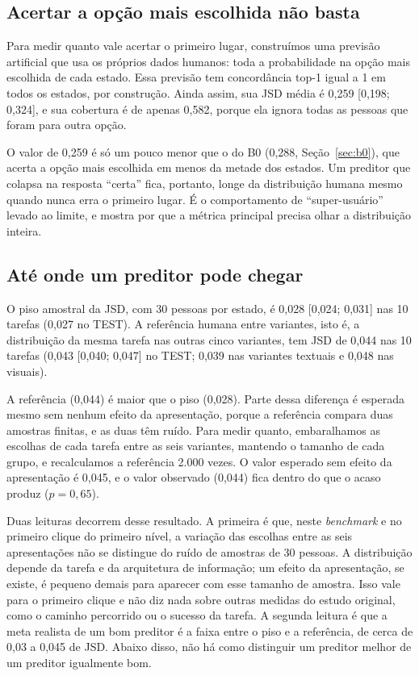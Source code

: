 \documentclass[12pt,oneside,a4paper,chapter=TITLE,english,brazil]{abntex2}
\begin{document}
\subsection{Acertar a opção mais escolhida não basta}

\begin{real}
Para medir quanto vale acertar o primeiro lugar, construímos uma previsão artificial que usa os próprios dados humanos: toda a probabilidade na opção mais escolhida de cada estado. Essa previsão tem concordância top-1 igual a 1 em todos os estados, por construção. Ainda assim, sua JSD média é 0,259 [0,198; 0,324], e sua cobertura é de apenas 0,582, porque ela ignora todas as pessoas que foram para outra opção.
\end{real}

O valor de 0,259 é só um pouco menor que o do B0 (0,288, Seção~\ref{sec:b0}), que acerta a opção mais escolhida em menos da metade dos estados. Um preditor que colapsa na resposta ``certa'' fica, portanto, longe da distribuição humana mesmo quando nunca erra o primeiro lugar. É o comportamento de ``super-usuário'' levado ao limite, e mostra por que a métrica principal precisa olhar a distribuição inteira.

\subsection{Até onde um preditor pode chegar}

\begin{real}
O piso amostral da JSD, com 30 pessoas por estado, é 0,028 [0,024; 0,031] nas 10 tarefas (0,027 no TEST). A referência humana entre variantes, isto é, a distribuição da mesma tarefa nas outras cinco variantes, tem JSD de 0,044 nas 10 tarefas (0,043 [0,040; 0,047] no TEST; 0,039 nas variantes textuais e 0,048 nas visuais).

A referência (0,044) é maior que o piso (0,028). Parte dessa diferença é esperada mesmo sem nenhum efeito da apresentação, porque a referência compara duas amostras finitas, e as duas têm ruído. Para medir quanto, embaralhamos as escolhas de cada tarefa entre as seis variantes, mantendo o tamanho de cada grupo, e recalculamos a referência 2.000 vezes. O valor esperado sem efeito da apresentação é 0,045, e o valor observado (0,044) fica dentro do que o acaso produz ($p=0{,}65$).
\end{real}

Duas leituras decorrem desse resultado. A primeira é que, neste \textit{benchmark} e no primeiro clique do primeiro nível, a variação das escolhas entre as seis apresentações não se distingue do ruído de amostras de 30 pessoas. A distribuição depende da tarefa e da arquitetura de informação; um efeito da apresentação, se existe, é pequeno demais para aparecer com esse tamanho de amostra. Isso vale para o primeiro clique e não diz nada sobre outras medidas do estudo original, como o caminho percorrido ou o sucesso da tarefa. A segunda leitura é que a meta realista de um bom preditor é a faixa entre o piso e a referência, de cerca de 0,03 a 0,045 de JSD. Abaixo disso, não há como distinguir um preditor melhor de um preditor igualmente bom.
\end{document}
